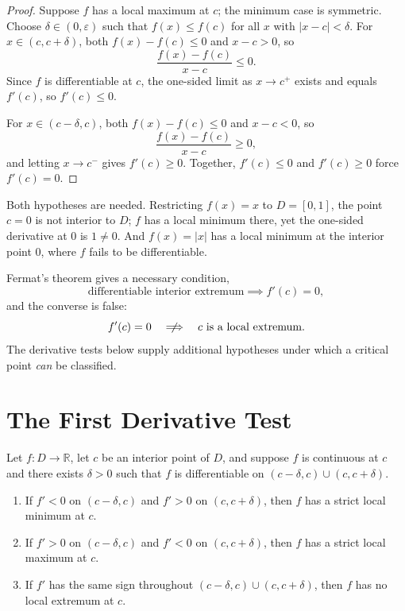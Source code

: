 \documentclass{essay}
\begin{document}
\begin{proof}
  Suppose \(f\) has a local maximum at \(c\); the minimum case is symmetric.
  Choose \(\delta\in(0,\varepsilon)\) such that \(f(x)\leq f(c)\) for all
  \(x\) with \(|x-c|<\delta\). For \(x\in(c,c+\delta)\), both \(f(x)-f(c)\leq
  0\) and \(x-c>0\), so
  \[ \frac{f(x)-f(c)}{x-c}\leq 0. \]
  Since \(f\) is differentiable at \(c\), the one-sided limit as \(x\to
  c^+\) exists and equals \(f'(c)\), so \(f'(c)\leq 0\).

  For \(x\in(c-\delta,c)\), both \(f(x)-f(c)\leq0\) and \(x-c<0\), so
  \[ \frac{f(x)-f(c)}{x-c}\geq 0, \]
  and letting \(x\to c^-\) gives \(f'(c)\geq 0\). Together, \(f'(c)\leq 0\)
  and \(f'(c)\geq 0\) force \(f'(c)=0\).
\end{proof}

Both hypotheses are needed. Restricting \(f(x)=x\) to \(D=[0,1]\), the point
\(c=0\) is not interior to \(D\); \(f\) has a local minimum there, yet the
one-sided derivative at \(0\) is \(1\neq 0\). And \(f(x)=|x|\) has a local
minimum at the interior point \(0\), where \(f\) fails to be differentiable.

Fermat's theorem gives a necessary condition,
\[ \text{differentiable interior extremum} \implies f'(c)=0, \]
and the converse is false:
\[ f'(c)=0 \quad\centernot\Longrightarrow\quad c \text{ is a local extremum}. \]
The derivative tests below supply additional hypotheses under which a
critical point \emph{can} be classified.

\section{The First Derivative Test}

\begin{theorem}
  Let \(f:D\to\mathbb{R}\), let \(c\) be an interior point of \(D\), and
  suppose \(f\) is continuous at \(c\) and there exists \(\delta>0\) such that
  \(f\) is differentiable on \((c-\delta,c)\cup(c,c+\delta)\).
  \begin{enumerate}
    \item If \(f'<0\) on \((c-\delta,c)\) and \(f'>0\) on \((c,c+\delta)\),
      then \(f\) has a strict local minimum at \(c\).
    \item If \(f'>0\) on \((c-\delta,c)\) and \(f'<0\) on \((c,c+\delta)\),
      then \(f\) has a strict local maximum at \(c\).
    \item If \(f'\) has the same sign throughout \((c-\delta,c)\cup(c,c+\delta)\),
      then \(f\) has no local extremum at \(c\).
  \end{enumerate}
\end{theorem}
\end{document}
